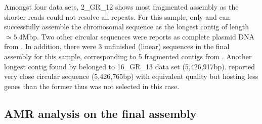 Amongst four data sets, 2\_GR\_12 shows most fragmented assembly as the shorter reads could not resolve all repeats. For this sample, only \npscarf{} and \canu{} can successfully assemble the chromosomal sequence as the longest contig of length $\simeq 5.4$Mbp. Two other circular sequences were reports as complete plasmid DNA from \unicycler{}. In addition, there were 3 unfinished (linear) sequences in the final assembly for this sample, corresponding to 5 fragmented contigs from \unicycler{}. Another longest contig found by \npscarf{} belonged to 16\_GR\_13 data set (5,426,917bp). \unicycler{} reported very close circular sequence (5,426,765bp) with equivalent quality but hosting less genes than the former thus was not selected in this case. %

\subsection{AMR analysis on the final assembly}

